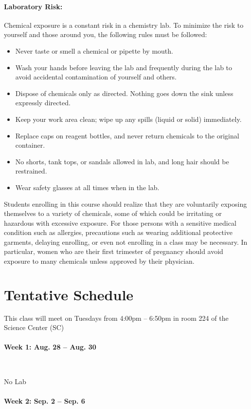 \documentclass[12pt, letterpaper]{article}
\begin{document}
\paragraph{Laboratory Risk:}
Chemical exposure is a constant risk in a chemistry lab. To minimize the risk to yourself and those around you, the following rules must be followed:
\begin{itemize}
	\item Never taste or smell a chemical or pipette by mouth.
	\item Wash your hands before leaving the lab and frequently during the lab to avoid accidental contamination of yourself and others.
	\item Dispose of chemicals only as directed. Nothing goes down the sink unless expressly directed.
	\item Keep your work area clean; wipe up any spills (liquid or solid) immediately.
	\item Replace caps on reagent bottles, and never return chemicals to the original container.
	\item No shorts, tank tops, or sandals allowed in lab, and long hair should be restrained.
	\item Wear safety glasses at all times when in the lab.
\end{itemize}
Students enrolling in this course should realize that they are voluntarily exposing themselves to a variety of chemicals, some of which could be irritating or hazardous with excessive exposure.  For those persons with a sensitive medical condition such as allergies, precautions such as wearing additional protective garments, delaying enrolling, or even not enrolling in a class may be necessary.  In particular, women who are their first trimester of pregnancy should avoid exposure to many chemicals unless approved by their physician.

\section*{Tentative Schedule}
This class will meet on Tuesdays from 4:00pm -- 6:50pm in room 224 of the Science Center (SC)

\paragraph{Week 1: Aug. 28 -- Aug. 30}~

No Lab

\paragraph{Week 2: Sep. 2 -- Sep. 6}~
\end{document}

